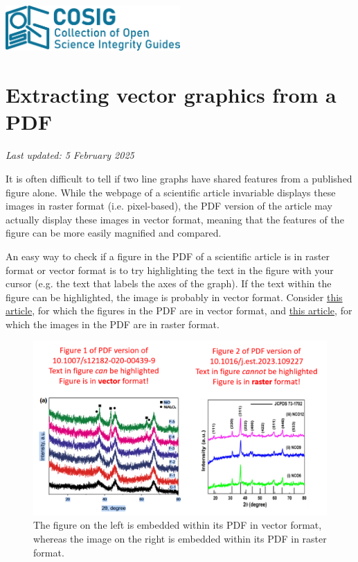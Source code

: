\documentclass[letterpaper, 12pt]{article}
\begin{document}
\flushleft
\includegraphics[width=0.5\textwidth]{img/home/241017_final_logo_mockup.png}

\section*{Extracting vector graphics from a PDF}
\textit{Last updated: 5 February 2025}

It is often difficult to tell if two line graphs have shared features from a published figure alone. While the webpage of a scientific article invariable displays these images in raster format (i.e. pixel-based), the PDF version of the article may actually display these images in vector format, meaning that the features of the figure can be more easily magnified and compared.

An easy way to check if a figure in the PDF of a scientific article is in raster format or vector format is to try highlighting the text in the figure with your cursor (e.g. the text that labels the axes of the graph). If the text within the figure can be highlighted, the image is probably in vector format. Consider \href{https://doi.org/10.1007/s12182-020-00439-9}{this article}, for which the figures in the PDF are in vector format, and \href{https://doi.org/10.1016/j.est.2023.109227}{this article}, for which the images in the PDF are in raster format.

\begin{figure}[h!tbp]
    \includegraphics[width=\textwidth]{img/vector/vector_vs_raster.PNG}
    \caption*{ The figure on the left is embedded within its PDF in vector format, whereas the image on the right is embedded within its PDF in raster format.}
\end{figure}
\end{document}

